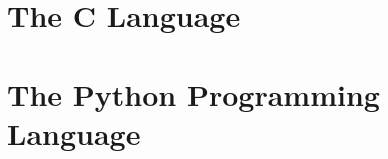 \documentclass[english,12pt,a4paper]{article}
\begin{document}

\nocite{*}
\maketitle
\thispagestyle{empty}

\pagebreak

\setcounter{page}{1}

\setcounter{tocdepth}{2}
\tableofcontents

\pagebreak

\clearpage

\section{The C Language}


\section{The Python Programming Language}


\clearpage
\pagebreak
\listoffigures
\end{document}
